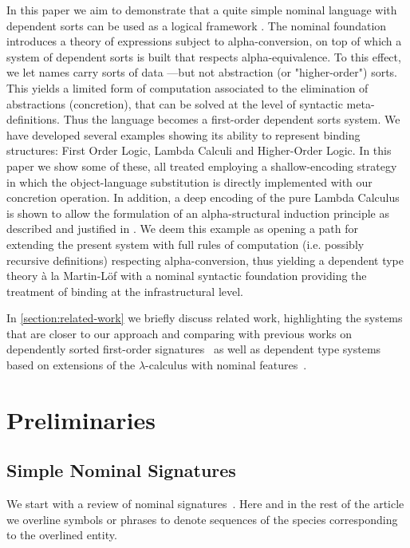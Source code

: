 \documentclass[11pt,a4paper]{amsart}
\newcounter{s}
\begin{document}
In this paper we aim to demonstrate that a quite simple nominal language with dependent sorts can be used as a logical framework \cite{harper:fradl}.
The nominal foundation introduces a theory of expressions subject to alpha-conversion,
on top of which a system of dependent sorts is built that respects  alpha-equivalence. To this effect, we let names carry sorts of data ---but not abstraction (or "higher-order") sorts. This yields a limited form of computation associated to the elimination of abstractions (concretion), that can be solved at the level of syntactic meta-definitions.
Thus the language becomes a first-order dependent sorts system.
We have developed several examples showing its ability to represent binding structures: First Order Logic, Lambda Calculi and Higher-Order Logic. In this paper we show some of these, all treated employing a shallow-encoding strategy in which the object-language substitution is directly implemented with our concretion operation. 
In addition, a deep encoding of the pure Lambda Calculus is shown to allow the  formulation of an alpha-structural induction principle as described and justified in \cite{pitts:alpsri}. We deem this example as opening a path for extending the present system with full rules of computation (i.e. possibly recursive definitions) respecting alpha-conversion, thus yielding a dependent type theory \`a la Martin-L\"of with a nominal syntactic foundation providing the treatment of binding at the infrastructural level.

In \cref{section:related-work} we briefly discuss  related work, highlighting the systems that are closer to our approach and comparing with previous works on dependently sorted first-order signatures~\cite{Cartmell86,SterlingJ:algttu} as well as dependent type systems based on extensions of the $\lambda$-calculus with nominal features~\cite{CheneyJ:depntt,PittsA:deptta}.

\section{Preliminaries}

\subsection{Simple Nominal Signatures}

We start with a review of  nominal signatures~\cite{UrbanC:nomu-jv,pitts:alpsri}. 
Here and in the rest of the article we overline symbols or phrases to denote sequences of the species corresponding to the overlined entity.
\end{document}
